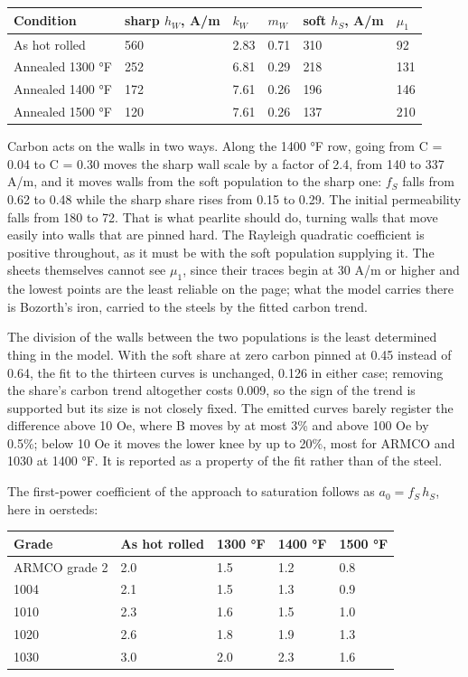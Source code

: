 \documentclass[
  11pt,
]{article}
\newcounter{none} %
\begin{document}
{\def\LTcaptype{none} %
\begin{longtable}[]{@{}llllll@{}}
\toprule\noalign{}
Condition & sharp \(h_W\), A/m & \(k_W\) & \(m_W\) & soft \(h_S\), A/m & \(\mu_1\) \\
\midrule\noalign{}
\endhead
\bottomrule\noalign{}
\endlastfoot
As hot rolled & 560 & 2.83 & 0.71 & 310 & 92 \\
Annealed 1300 °F & 252 & 6.81 & 0.29 & 218 & 131 \\
Annealed 1400 °F & 172 & 7.61 & 0.26 & 196 & 146 \\
Annealed 1500 °F & 120 & 7.61 & 0.26 & 137 & 210 \\
\end{longtable}
}

Carbon acts on the walls in two ways. Along the 1400 °F row, going from C = 0.04 to C = 0.30 moves the sharp wall scale by a factor of 2.4, from 140 to 337 A/m, and it moves walls from the soft population to the sharp one: \(f_S\) falls from 0.62 to 0.48 while the sharp share rises from 0.15 to 0.29. The initial permeability falls from 180 to 72. That is what pearlite should do, turning walls that move easily into walls that are pinned hard. The Rayleigh quadratic coefficient is positive throughout, as it must be with the soft population supplying it. The sheets themselves cannot see \(\mu_1\), since their traces begin at 30 A/m or higher and the lowest points are the least reliable on the page; what the model carries there is Bozorth's iron, carried to the steels by the fitted carbon trend.

The division of the walls between the two populations is the least determined thing in the model. With the soft share at zero carbon pinned at 0.45 instead of 0.64, the fit to the thirteen curves is unchanged, 0.126 in either case; removing the share's carbon trend altogether costs 0.009, so the sign of the trend is supported but its size is not closely fixed. The emitted curves barely register the difference above 10 Oe, where B moves by at most 3\% and above 100 Oe by 0.5\%; below 10 Oe it moves the lower knee by up to 20\%, most for ARMCO and 1030 at 1400 °F. It is reported as a property of the fit rather than of the steel.

The first-power coefficient of the approach to saturation follows as \(a_0 = f_S\,h_S\), here in oersteds:

{\def\LTcaptype{none} %
\begin{longtable}[]{@{}lllll@{}}
\toprule\noalign{}
Grade & As hot rolled & 1300 °F & 1400 °F & 1500 °F \\
\midrule\noalign{}
\endhead
\bottomrule\noalign{}
\endlastfoot
ARMCO grade 2 & 2.0 & 1.5 & 1.2 & 0.8 \\
1004 & 2.1 & 1.5 & 1.3 & 0.9 \\
1010 & 2.3 & 1.6 & 1.5 & 1.0 \\
1020 & 2.6 & 1.8 & 1.9 & 1.3 \\
1030 & 3.0 & 2.0 & 2.3 & 1.6 \\
\end{longtable}
}
\end{document}
